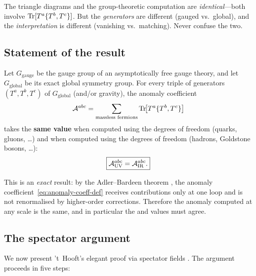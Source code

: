 \documentclass[11pt,a4paper]{article}
\begin{document}
\noindent The triangle diagrams and the group-theoretic computation are
\emph{identical}---both involve $\mathrm{Tr}[T^a\{T^b, T^c\}]$.  But the
\emph{generators} are different (gauged vs.\ global), and the
\emph{interpretation} is different (vanishing vs.\ matching).  Never confuse
the two.

\subsection{Statement of the result}

\begin{theorem}
\label{thm:anomaly-matching}
Let $G_{\text{gauge}}$ be the gauge group of an asymptotically free gauge
theory, and let $G_{\text{global}}$ be its exact global symmetry group.
For every triple of generators $(T^a, T^b, T^c)$ of $G_{\text{global}}$
(and/or gravity), the anomaly coefficient
\begin{equation}
  \mathcal{A}^{abc}
  = \sum_{\text{massless fermions}}
    \mathrm{Tr}\!\bigl[T^a\{T^b, T^c\}\bigr]
  \label{eq:anomaly-matching}
\end{equation}
takes the \textbf{same value} when computed using the \UV{} degrees of
freedom (quarks, gluons, \ldots) and when computed using the \IR{} degrees
of freedom (hadrons, Goldstone bosons, \ldots):
\begin{equation}
  \boxed{\mathcal{A}^{abc}_{\mathrm{UV}} = \mathcal{A}^{abc}_{\mathrm{IR}}.}
  \label{eq:matching-boxed}
\end{equation}
\end{theorem}

\noindent This is an \emph{exact} result: by the Adler--Bardeen theorem
\cite{AdlerBardeen1969}, the anomaly coefficient~\eqref{eq:anomaly-coeff-def}
receives contributions only at one loop and is not renormalised by
higher-order corrections.  Therefore the anomaly computed at any scale
is the same, and in particular the \UV{} and \IR{} values must agree.

\subsection{The spectator argument}
\label{subsec:spectator}

We now present 't~Hooft's elegant proof via spectator fields
\cite{tHooft1980,PeskinTASI1996}.  The argument proceeds in five steps:
\end{document}
